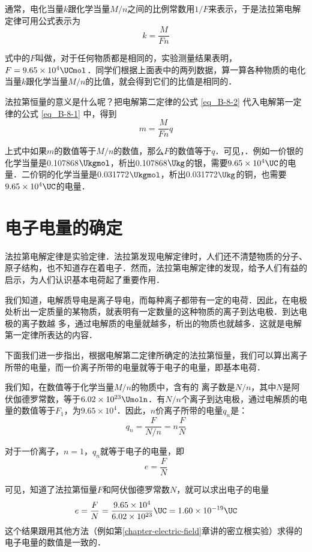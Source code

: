 通常，电化当量$k$跟化学当量$M/n$之间的比例常数用$1/F$来表示，于是法拉第电解定律可用公式表示为
\begin{equation} \label{eq_B-8-2}
    k=\frac{M}{Fn}
\end{equation}

式中的$F$叫做，对于任何物质都是相同的，实验测量结果表明，$F=9.65\times10^4\UCmol$．同学们根据上面表中的两列数据，算一算各种物质的电化当量$k$跟化学当量$M/n$的比值，就会得到它们的比值是相同的．

法拉第恒量的意义是什么呢？把电解第二定律的公式 \eqref{eq_B-8-2} 代入电解第一定律的公式 \eqref{eq_B-8-1} 中，得到
\begin{equation}\label{eq_B-8-3}
    m=\frac{M}{Fn}q
\end{equation}

上式中如果$m$的数值等于$M/n$的数值，那么$F$的数值等于$q$．可见，．例如一价银的化学当量是0.107868$\Ukgmol$，析出0.107868$\Ukg$的银，需要$9.65\times10^4 \UC $的电量．二价铜的化学当量是0.031772$\Ukgmol$，析出0.031772$\Ukg$的铜，也需要$9.65\times10^4 \UC$的电量．

\section{电子电量的确定}
法拉第电解定律是实验定律．法拉第发现电解定律时，人们还不清楚物质的分子、原子结构，也不知道存在着电子．然而，法拉第电解定律的发现，给予人们有益的启示，为人们认识基本电荷起了重要作用．

我们知道，电解质导电是离子导电，而每种离子都带有一定的电荷．因此，在电极处析出一定质量的某物质，就表明有一定数量的这种物质的离子到达电极．到达电极的离子数越
多，通过电解质的电量就越多，析出的物质也就越多．这就是电解第一定律所表达的内容．

下面我们进一步指出，根据电解第二定律所确定的法拉第恒量，我们可以算出离子所带的电量，而一价离子所带的电量就等于电子的电量，即基本电荷．

我们知，在数值等于化学当量$M/n$的物质中，含有的
离子数是$N/n$，其中$N$是阿伏伽德罗常数，等于$6.02\times10^{23} \Umoln $．有$N/n$个离子到达电极，通过电解质的电量的数值等于$F_1$，为$9.65\times10^4$．因此，$n$价离子所带的电量$q_n$是：
\[q_n=\frac{F}{N/n}=n\frac{F}{N} \]

对于一价离子，$n=1$，$q_n$就等于电子的电量，即
\[e=\frac{F}{N}\]

可见，知道了法拉第恒量$F$和阿伏伽德罗常数$N$，就可以求出电子的电量 
\[e=\frac{F}{N}=\frac{9.65\times10^4}{6.02\times10^{23}}\UC =1.60\times 10^{-19}\UC \]
这个结果跟用其他方法（例如第\ref{chapter-electric-field}章讲的密立根实验）求得的电子电量的数值是一致的．

